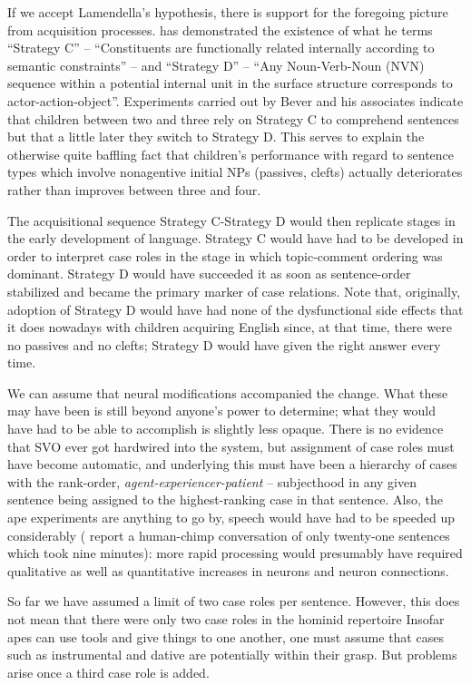 If we accept Lamendella's hypothesis, there is support for the foregoing picture from acquisition processes. \citet{Bever1970} has demonstrated the existence of what he terms ``Strategy C'' -- ``Constituents are functionally related internally according to semantic constraints'' -- and ``Strategy D'' -- ``Any Noun-Verb-Noun (NVN) sequence within a potential internal unit in the surface structure corresponds to actor-action-object''. Experiments carried out by Bever and his associates indicate that children between two and three rely on Strategy C to comprehend sentences but that a little later they switch to Strategy D. This serves to explain the otherwise quite baffling fact that children's performance with regard to sentence types which involve nonagentive initial NPs (passives, clefts) actually deteriorates rather than improves between three and four.

The acquisitional sequence Strategy C-Strategy D would then replicate stages in the early development of language. Strategy C would have had to be developed in order to interpret case roles in the stage
in which topic-comment ordering was dominant. Strategy D would have succeeded it as soon as sentence-order stabilized and became the primary marker of case relations. Note that, originally, adoption of Strategy D would have had none of the dysfunctional side effects that it does nowadays with children acquiring English since, at that time, there were no passives and no clefts; Strategy D would have given the right answer every time.

We can assume that neural modifications accompanied the change. What these may have been is still beyond anyone's power to determine; what they would have had to be able to accomplish is slightly less opaque. There is no evidence that SVO ever got hardwired into the system, but assignment of case roles must have become automatic, and underlying this must have been a hierarchy of cases with the rank-order, \textit{agent-experiencer-patient} -- subjecthood in any given sentence being assigned to the highest-ranking case in that sentence. Also, the ape experiments are anything to go by, speech would have had to be speeded up considerably (\citet{RumbaughEtAl1976} report a human-chimp conversation of only twenty-one sentences which took nine minutes): more rapid processing would presumably have required qualitative as well as quantitative increases in neurons and neuron connections.

So far we have assumed a limit of two case roles per sentence. However, this does not mean that there were only two case roles in the hominid repertoire Insofar apes can use tools and give things to one another, one must assume that cases such as instrumental and dative are potentially within their grasp. But problems arise once a third case role is added.

